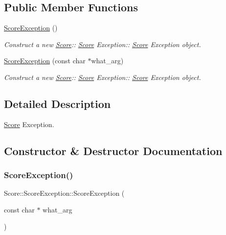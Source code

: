 \subsection*{Public Member Functions}
\begin{DoxyCompactItemize}
\item 
\mbox{\label{class_score_1_1_score_exception_a0a194b39f0d5b5b2927ad93fce4e314c}} 
\hyperlink{class_score_1_1_score_exception_a0a194b39f0d5b5b2927ad93fce4e314c}{Score\+Exception} ()
\begin{DoxyCompactList}\small\item\em Construct a new \hyperlink{class_score}{Score}\+:\+: \hyperlink{class_score}{Score} Exception\+:\+: \hyperlink{class_score}{Score} Exception object. \end{DoxyCompactList}\item 
\hyperlink{class_score_1_1_score_exception_a517cc8db24ffabfe66cc59b4a5483455}{Score\+Exception} (const char $\ast$what\+\_\+arg)
\begin{DoxyCompactList}\small\item\em Construct a new \hyperlink{class_score}{Score}\+:\+: \hyperlink{class_score}{Score} Exception\+:\+: \hyperlink{class_score}{Score} Exception object. \end{DoxyCompactList}\end{DoxyCompactItemize}


\subsection{Detailed Description}
\hyperlink{class_score}{Score} Exception. 

\subsection{Constructor \& Destructor Documentation}
\mbox{\label{class_score_1_1_score_exception_a517cc8db24ffabfe66cc59b4a5483455}} 
\subsubsection{\texorpdfstring{Score\+Exception()}{ScoreException()}}
{\footnotesize\ttfamily Score\+::\+Score\+Exception\+::\+Score\+Exception (\begin{DoxyParamCaption}\item[{const char $\ast$}]{what\+\_\+arg }\end{DoxyParamCaption})\hspace{0.3cm}{\ttfamily [explicit]}}



